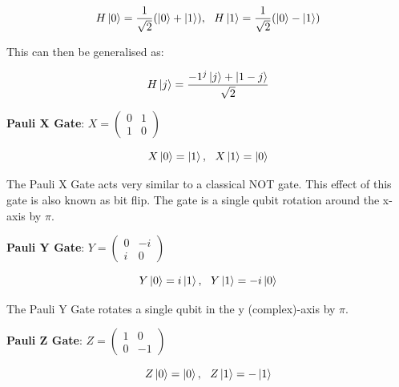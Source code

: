 \documentclass{article}
\begin{document}
\begin{equation}
H\ket{0} = \frac{1}{\sqrt{2}} (\ket{0} + \ket{1}), \ \ H\ket{1} = \frac{1}{\sqrt{2}}(\ket{0} - \ket{1})   
\end{equation}
\vspace{5mm}

\noindent
This can then be generalised as:
\vspace{5mm}

\begin{equation}
H\ket{j} = \frac{-1^j\ket{j} + \ket{1 - j}}{\sqrt{2}} 
\end{equation}
\vspace{5mm}


\textbf{Pauli X Gate}: \qquad $X = \begin{pmatrix} 0 & 1 \\ 1 & 0 \end{pmatrix}$
\vspace{5mm}


\begin{equation}
X\ket{0} = \ket{1} , \ \ X\ket{1} = \ket{0}
\end{equation}
\vspace{5mm}

\noindent
The Pauli X Gate acts very similar to a classical NOT gate. This effect of this gate is also known as bit flip. The gate is a single qubit rotation around the x-axis by $\pi$.
\vspace{5mm}


\textbf{Pauli Y Gate}: \qquad $Y = \begin{pmatrix} 0 & -i \\ i & 0 \end{pmatrix}$
\vspace{5mm}


\begin{equation}
Y\ket{0} = i\ket{1} , \ \ Y\ket{1} = -i\ket{0}
\end{equation}
\vspace{5mm}

\noindent
The Pauli Y Gate rotates a single qubit in the y (complex)-axis by $\pi$.
\vspace{5mm}


\textbf{Pauli Z Gate}: \qquad $Z = \begin{pmatrix} 1 & 0 \\ 0 & -1 \end{pmatrix}$
\vspace{5mm}


\begin{equation}
Z\ket{0} = \ket{0} , \ \ Z\ket{1} = -\ket{1}  
\end{equation}
\vspace{5mm}
\end{document}
